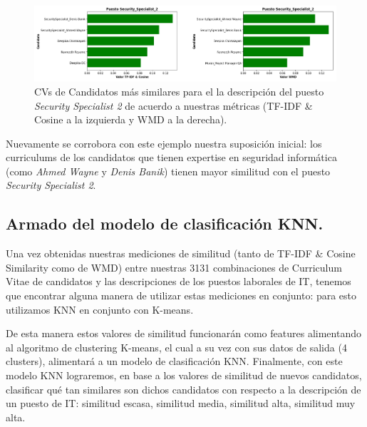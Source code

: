 \documentclass[12pt,a4paper]{article}
\begin{document}
\begin{sloppypar}
\begin{figure}[H] 
 \centering
 \includegraphics[width=1\textwidth]{images/implementacion_5/Valores_para_security_spec_2.png}
 \captionsetup{justification=centering,margin=2cm}
 \caption{CVs de Candidatos más similares para el la descripción del puesto \textit{Security Specialist 2} de acuerdo a nuestras métricas (TF-IDF \& Cosine a la izquierda y WMD a la derecha).} 
 \label{fig:Valores_para_security_spec_2}
\end{figure}

Nuevamente se corrobora con este ejemplo nuestra suposición inicial: los curriculums de los candidatos que tienen expertise en seguridad informática (como \textit{Ahmed Wayne} y \textit{Denis Banik}) tienen mayor similitud con el puesto \textit{Security Specialist 2}.

\cleardoublepage

\subsection{Armado del modelo de clasificación KNN.}\label{IMP_Modelo_clasificacion_KNN}

Una vez obtenidas nuestras mediciones de similitud (tanto de TF-IDF \& Cosine Similarity como de WMD) entre nuestras 3131 combinaciones de Curriculum Vitae de candidatos y las descripciones de los puestos laborales de IT, tenemos que encontrar alguna manera de utilizar estas mediciones en conjunto: para esto utilizamos KNN en conjunto con K-means.

De esta manera estos valores de similitud funcionarán como features alimentando al algoritmo de clustering K-means, el cual a su vez con sus datos de salida (4 clusters), alimentará a un modelo de clasificación KNN. Finalmente, con este modelo KNN lograremos, en base a los valores de similitud de nuevos candidatos, clasificar qué tan similares son dichos candidatos con respecto a la descripción de un puesto de IT: similitud escasa, similitud media, similitud alta, similitud muy alta.


\end{sloppypar}
\end{document}
